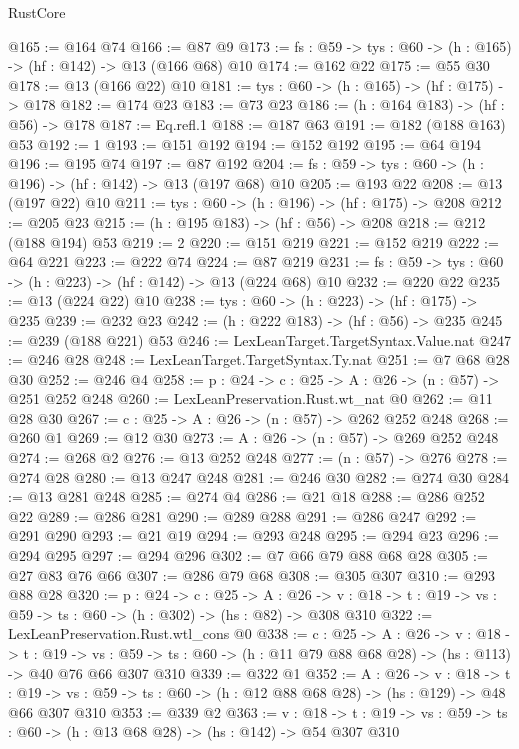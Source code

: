 \begin{lexlean}{RustCore}
\begin{coremodule}
@165 := @164 @74
@166 := @87 @9
@173 := {fs : @59} -> {tys : @60} -> (h : @165) -> (hf : @142) -> @13 (@166 @68) @10
@174 := @162 @22
@175 := @55 @30
@178 := @13 (@166 @22) @10
@181 := {tys : @60} -> (h : @165) -> (hf : @175) -> @178
@182 := @174 @23
@183 := @73 @23
@186 := (h : @164 @183) -> (hf : @56) -> @178
@187 := Eq.refl.{1}
@188 := @187 @63
@191 := @182 (@188 @163) @53
@192 := 1
@193 := @151 @192
@194 := @152 @192
@195 := @64 @194
@196 := @195 @74
@197 := @87 @192
@204 := {fs : @59} -> {tys : @60} -> (h : @196) -> (hf : @142) -> @13 (@197 @68) @10
@205 := @193 @22
@208 := @13 (@197 @22) @10
@211 := {tys : @60} -> (h : @196) -> (hf : @175) -> @208
@212 := @205 @23
@215 := (h : @195 @183) -> (hf : @56) -> @208
@218 := @212 (@188 @194) @53
@219 := 2
@220 := @151 @219
@221 := @152 @219
@222 := @64 @221
@223 := @222 @74
@224 := @87 @219
@231 := {fs : @59} -> {tys : @60} -> (h : @223) -> (hf : @142) -> @13 (@224 @68) @10
@232 := @220 @22
@235 := @13 (@224 @22) @10
@238 := {tys : @60} -> (h : @223) -> (hf : @175) -> @235
@239 := @232 @23
@242 := (h : @222 @183) -> (hf : @56) -> @235
@245 := @239 (@188 @221) @53
@246 := LexLeanTarget.TargetSyntax.Value.nat
@247 := @246 @28
@248 := LexLeanTarget.TargetSyntax.Ty.nat
@251 := @7 @68 @28 @30
@252 := @246 @4
@258 := {p : @24} -> {c : @25} -> {A : @26} -> (n : @57) -> @251 @252 @248
@260 := LexLeanPreservation.Rust.wt_nat @0
@262 := @11 @28 @30
@267 := {c : @25} -> {A : @26} -> (n : @57) -> @262 @252 @248
@268 := @260 @1
@269 := @12 @30
@273 := {A : @26} -> (n : @57) -> @269 @252 @248
@274 := @268 @2
@276 := @13 @252 @248
@277 := (n : @57) -> @276
@278 := @274 @28
@280 := @13 @247 @248
@281 := @246 @30
@282 := @274 @30
@284 := @13 @281 @248
@285 := @274 @4
@286 := @21 @18
@288 := @286 @252 @22
@289 := @286 @281
@290 := @289 @288
@291 := @286 @247
@292 := @291 @290
@293 := @21 @19
@294 := @293 @248
@295 := @294 @23
@296 := @294 @295
@297 := @294 @296
@302 := @7 @66 @79 @88 @68 @28
@305 := @27 @83 @76 @66
@307 := @286 @79 @68
@308 := @305 @307
@310 := @293 @88 @28
@320 := {p : @24} ->
  {c : @25} ->
  {A : @26} ->
  {v : @18} -> {t : @19} -> {vs : @59} -> {ts : @60} -> (h : @302) -> (hs : @82) -> @308 @310
@322 := LexLeanPreservation.Rust.wtl_cons @0
@338 := {c : @25} ->
  {A : @26} ->
  {v : @18} ->
  {t : @19} ->
  {vs : @59} -> {ts : @60} -> (h : @11 @79 @88 @68 @28) -> (hs : @113) -> @40 @76 @66 @307 @310
@339 := @322 @1
@352 := {A : @26} ->
  {v : @18} ->
  {t : @19} -> {vs : @59} -> {ts : @60} -> (h : @12 @88 @68 @28) -> (hs : @129) -> @48 @66 @307 @310
@353 := @339 @2
@363 := {v : @18} ->
  {t : @19} -> {vs : @59} -> {ts : @60} -> (h : @13 @68 @28) -> (hs : @142) -> @54 @307 @310

\end{coremodule}
\end{lexlean}
